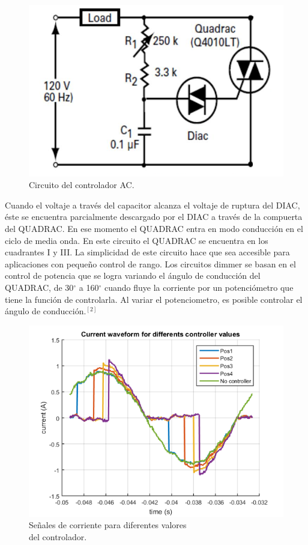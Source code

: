 \documentclass[journal]{IEEEtran}
\begin{document}
\begin{figure}[h]
\centering
\includegraphics[clip,width=\columnwidth]{controller.png}
\caption{Circuito del controlador AC.}
\label{ACcontroller}
\end{figure}

Cuando el voltaje a través del capacitor alcanza el 
voltaje de ruptura del DIAC, éste se encuentra 
parcialmente descargado por el DIAC a través de la 
compuerta del QUADRAC. En ese momento el QUADRAC 
entra en modo conducción en el ciclo de media onda. 
En este circuito el QUADRAC se encuentra en los 
cuadrantes I y III. La simplicidad de este circuito 
hace que sea accesible para aplicaciones con pequeño 
control de rango. Los circuitos dimmer se basan en el 
control de potencia que se logra variando el ángulo de 
conducción del QUADRAC, de 30$^{\circ}$ a 160$^{\circ}$ 
cuando fluye la 
corriente por un potenciómetro que tiene la función de 
controlarla. Al variar el potenciometro, es 
posible controlar el
ángulo de conducción.$^{\left[2\right]}$ \\

\begin{figure}[h]
\centering
\includegraphics[clip,width=\columnwidth]{controller_values.png}
\caption{Señales de corriente para diferentes valores \\
del controlador.}
\label{ACcontroller_plots}
\end{figure}
\end{document}
